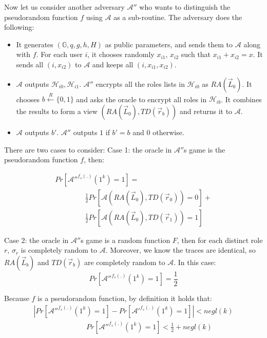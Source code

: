 \documentclass[final,5p,times,twocolumn]{elsarticle}
\begin{document}
Now let us consider another adversary $\mathcal{A}''$ who wants to distinguish the
pseudorandom function $f$ using $\mathcal{A}$ as a sub-routine. The adversary does the following:
\begin{itemize}
\item It generates $(\mathbb{G}, q, g, h, H)$ as public parameters, and sends them to $\mathcal{A}$ along with $f$. For each user $i$, it chooses randomly $x_{i1}$, $x_{i2}$ such that $x_{i1} + x_{i2} = x$. It sends all $(i, x_{i2})$ to $\mathcal{A}$ and keeps all $(i, x_{i1}, x_{i2})$.
\item $\mathcal{A}$ outputs $\mathcal{H}_{i0},\mathcal{H}_{i1}$. $\mathcal{A}''$ encrypts all the roles lists in $\mathcal{H}_{i0}$ as $RA(\vec{L}_0)$. It chooses $b \xleftarrow{R} \{0,1\}$ and asks the oracle to encrypt all roles in $\mathcal{H}_{ib}$. It combines the results to form a view $(RA(\vec{L}_0),TD(\vec{r}_b))$ and returns it to $\mathcal{A}$.
\item $\mathcal{A}$ outputs $b'$. $\mathcal{A}''$ outputs $1$ if $b'=b$ and $0$ otherwise.
\end{itemize}

There are two cases to consider:
Case 1: the oracle in $\mathcal{A}''$s game is the pseudorandom function $f$, then:

\begin{equation}
\begin{array}{l}
Pr[\mathcal{A}''^{f_{s}(.)}(1^k)=1] = \\
\hspace{50pt} \frac{1}{2}Pr[\mathcal{A}(RA(\vec{L}_0),TD(\vec{r}_0))=0]+\\
\hspace{50pt} \frac{1}{2}Pr[\mathcal{A}(RA(\vec{L}_0),TD(\vec{r}_1))=1]
\end{array}
\end{equation}

Case 2: the oracle in $\mathcal{A}''$s game is a random function $F$, then for each distinct
role $r$, $\sigma_r$ is completely random to $\mathcal{A}$. Moreover, we know the traces are identical, so $RA(\vec{L}_b)$ and $TD(\vec{r}_b)$ are completely random to $\mathcal{A}$. In this case:
\begin{equation}
Pr[\mathcal{A}''^{f_{s}(.)}(1^k)=1]=\frac{1}{2}
\end{equation}

Because $f$ is a pseudorandom function, by definition it holds that:
\begin{equation}
\begin{array}{l}
|Pr[\mathcal{A}''^{f_{s}(.)}(1^k)=1]-Pr[\mathcal{A}'^{f_{s}(.)}(1^k)=1]|<negl(k)\\
\hspace{88pt}Pr[\mathcal{A}''^{f_{s}(.)}(1^k)=1]<\frac{1}{2}+negl(k)
\end{array}
\end{equation}
\end{document}
